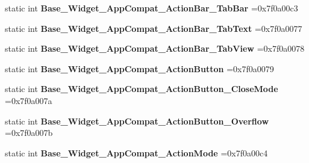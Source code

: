 \begin{DoxyCompactItemize}
\mbox{\label{classandroid_1_1support_1_1v7_1_1cardview_1_1R_1_1style_a38019a7687aa5da76c07d85dbd2eb071}} 
static int {\bfseries Base\+\_\+\+Widget\+\_\+\+App\+Compat\+\_\+\+Action\+Bar\+\_\+\+Tab\+Bar} =0x7f0a00c3
\item 
\mbox{\label{classandroid_1_1support_1_1v7_1_1cardview_1_1R_1_1style_adacaa159613fb2bef050937cef84ea3d}} 
static int {\bfseries Base\+\_\+\+Widget\+\_\+\+App\+Compat\+\_\+\+Action\+Bar\+\_\+\+Tab\+Text} =0x7f0a0077
\item 
\mbox{\label{classandroid_1_1support_1_1v7_1_1cardview_1_1R_1_1style_a544269ce6d58c3bd5758b768ff2c0389}} 
static int {\bfseries Base\+\_\+\+Widget\+\_\+\+App\+Compat\+\_\+\+Action\+Bar\+\_\+\+Tab\+View} =0x7f0a0078
\item 
\mbox{\label{classandroid_1_1support_1_1v7_1_1cardview_1_1R_1_1style_a0d8f8a44e611653def99514200a7fbd0}} 
static int {\bfseries Base\+\_\+\+Widget\+\_\+\+App\+Compat\+\_\+\+Action\+Button} =0x7f0a0079
\item 
\mbox{\label{classandroid_1_1support_1_1v7_1_1cardview_1_1R_1_1style_acb8c5b49dddafdadaa71887eb1d92742}} 
static int {\bfseries Base\+\_\+\+Widget\+\_\+\+App\+Compat\+\_\+\+Action\+Button\+\_\+\+Close\+Mode} =0x7f0a007a
\item 
\mbox{\label{classandroid_1_1support_1_1v7_1_1cardview_1_1R_1_1style_a103900ff2227724341b95a7e294967ca}} 
static int {\bfseries Base\+\_\+\+Widget\+\_\+\+App\+Compat\+\_\+\+Action\+Button\+\_\+\+Overflow} =0x7f0a007b
\item 
\mbox{\label{classandroid_1_1support_1_1v7_1_1cardview_1_1R_1_1style_a7a7b8dd714c5590b263150c4a94a0148}} 
static int {\bfseries Base\+\_\+\+Widget\+\_\+\+App\+Compat\+\_\+\+Action\+Mode} =0x7f0a00c4
\item 
\mbox{\label{classandroid_1_1support_1_1v7_1_1cardview_1_1R_1_1style_ac778c36540858fe1f5261c7aec6237c0}} 

\end{DoxyCompactItemize}
